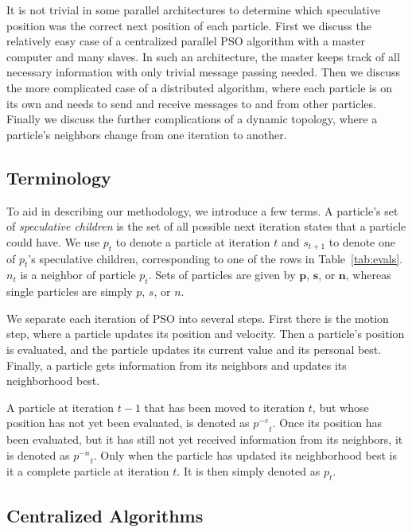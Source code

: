 \documentclass[journal,letterpaper]{IEEEtran}
\providecommand{\noeval}[1]{\ensuremath{#1^{-e}}}
\providecommand{\nonbest}[1]{\ensuremath{#1^{-n}}}
\providecommand{\p}{\ensuremath{p}}
\providecommand{\pset}{\ensuremath{\mathbf{p}}}
\providecommand{\s}{\ensuremath{s}}
\providecommand{\sset}{\ensuremath{\mathbf{s}}}
\providecommand{\n}{\ensuremath{n}}
\providecommand{\nset}{\ensuremath{\mathbf{n}}}
\begin{document}
It is not trivial in some parallel architectures to determine which speculative
position was the correct next position of each particle.  First we discuss the
relatively easy case of a centralized parallel PSO algorithm with a master
computer and many slaves.  In such an architecture, the master keeps track of
all necessary information with only trivial message passing needed.  Then we
discuss the more complicated case of a distributed algorithm, where each
particle is on its own and needs to send and receive messages to and from other
particles.  Finally we discuss the further complications of a dynamic topology,
where a particle's neighbors change from one iteration to another.

\subsection{Terminology}

To aid in describing our methodology, we introduce a few terms.  A particle's
set of \emph{speculative children} is the set of all possible next iteration
states that a particle could have.  We use $\p_t$ to denote a particle at
iteration $t$ and $\s_{t+1}$ to denote one of $\p_t$'s speculative children,
corresponding to one of the rows in Table~\ref{tab:evals}.  $\n_t$ is a
neighbor of particle $\p_t$.  Sets of particles are given by $\pset$, $\sset$,
or $\nset$, whereas single particles are simply $\p$, $\s$, or $\n$.

We separate each iteration of PSO into several steps.  First there is the
motion step, where a particle updates its position and velocity.  Then a
particle's position is evaluated, and the particle updates its current value
and its personal best.  Finally, a particle gets information from its neighbors
and updates its neighborhood best.

A particle at iteration $t-1$ that has been moved to iteration $t$, but whose
position has not yet been evaluated, is denoted as $\noeval{\p}_t$.  Once its
position has been evaluated, but it has still not yet received information from
its neighbors, it is denoted as $\nonbest{\p}_t$.  Only when the particle has
updated its neighborhood best is it a complete particle at iteration $t$.  It is
then simply denoted as $\p_t$.

\subsection{Centralized Algorithms}
\end{document}
